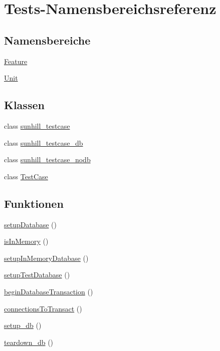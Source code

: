 \hypertarget{namespaceTests}{}\section{Tests-\/\+Namensbereichsreferenz}
\label{namespaceTests}
\subsection*{Namensbereiche}
\begin{DoxyCompactItemize}
\item 
 \hyperlink{namespaceTests_1_1Feature}{Feature}
\item 
 \hyperlink{namespaceTests_1_1Unit}{Unit}
\end{DoxyCompactItemize}
\subsection*{Klassen}
\begin{DoxyCompactItemize}
\item 
class \hyperlink{classTests_1_1sunhill__testcase}{sunhill\+\_\+testcase}
\item 
class \hyperlink{classTests_1_1sunhill__testcase__db}{sunhill\+\_\+testcase\+\_\+db}
\item 
class \hyperlink{classTests_1_1sunhill__testcase__nodb}{sunhill\+\_\+testcase\+\_\+nodb}
\item 
class \hyperlink{classTests_1_1TestCase}{Test\+Case}
\end{DoxyCompactItemize}
\subsection*{Funktionen}
\begin{DoxyCompactItemize}
\item 
\hyperlink{namespaceTests_a8f03c9e1722fde365bab9ff9c0109f1e}{setup\+Database} ()
\item 
\hyperlink{namespaceTests_a6d14bd4b535e21847e4506fbcba3e4d5}{is\+In\+Memory} ()
\item 
\hyperlink{namespaceTests_a2272eb6a027bdc19e7c8d22cd7c9c103}{setup\+In\+Memory\+Database} ()
\item 
\hyperlink{namespaceTests_a71b2492d450b5daf3a28394bacf9b748}{setup\+Test\+Database} ()
\item 
\hyperlink{namespaceTests_aeae90ed4a61f6fdbfb44b913099c2773}{begin\+Database\+Transaction} ()
\item 
\hyperlink{namespaceTests_a3f50d9094b746f372c784950c0eaf1a0}{connections\+To\+Transact} ()
\item 
\hyperlink{namespaceTests_af1490090c5c6dcb917b017ff2f255e32}{setup\+\_\+db} ()
\item 
\hyperlink{namespaceTests_a8d90baec1c93ea313cd6148aa0e999f8}{teardown\+\_\+db} ()
\end{DoxyCompactItemize}
